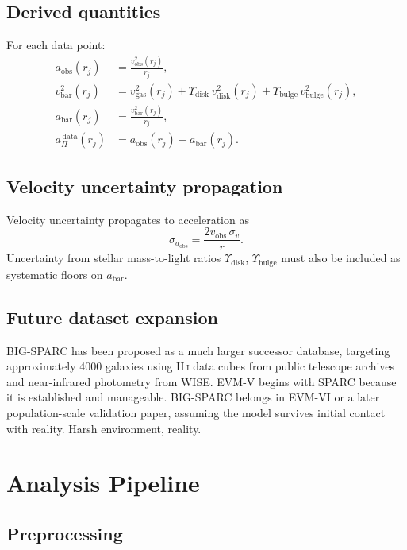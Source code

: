 \documentclass[11pt,a4paper,oneside]{article}
\newcommand{\aobs}{a_{\mathrm{obs}}}
\newcommand{\abar}{a_{\mathrm{bar}}}
\newcommand{\aPi}{a_{\Pi}}
\newcommand{\vobs}{v_{\mathrm{obs}}}
\newcommand{\vbar}{v_{\mathrm{bar}}}
\newcommand{\vgas}{v_{\mathrm{gas}}}
\newcommand{\vdisk}{v_{\mathrm{disk}}}
\newcommand{\vbulge}{v_{\mathrm{bulge}}}
\newcommand{\Upsdisk}{\Upsilon_{\mathrm{disk}}}
\newcommand{\Upsbulge}{\Upsilon_{\mathrm{bulge}}}
\begin{document}
\subsection{Derived quantities}

For each data point:
\begin{align}
    \aobs(r_j) &= \frac{\vobs^2(r_j)}{r_j}, \\[4pt]
    \vbar^2(r_j) &= \vgas^2(r_j)
        + \Upsdisk\,\vdisk^2(r_j) + \Upsbulge\,\vbulge^2(r_j), \\[4pt]
    \abar(r_j) &= \frac{\vbar^2(r_j)}{r_j}, \\[4pt]
    \aPi^{\,\mathrm{data}}(r_j) &= \aobs(r_j) - \abar(r_j).
\end{align}

\subsection{Velocity uncertainty propagation}

Velocity uncertainty propagates to acceleration as
\[
    \sigma_{\aobs} = \frac{2\vobs\,\sigma_v}{r}.
\]
Uncertainty from stellar mass-to-light ratios $\Upsdisk$, $\Upsbulge$ must also be
included as systematic floors on $\abar$.

\subsection{Future dataset expansion}

BIG-SPARC has been proposed as a much larger successor database, targeting approximately
4000 galaxies using H\,\textsc{i} data cubes from public telescope archives and
near-infrared photometry from WISE. EVM-V begins with SPARC because it is established
and manageable. BIG-SPARC belongs in EVM-VI or a later population-scale validation
paper, assuming the model survives initial contact with reality. Harsh environment,
reality.

\section{Analysis Pipeline}

\subsection{Preprocessing}
\end{document}
